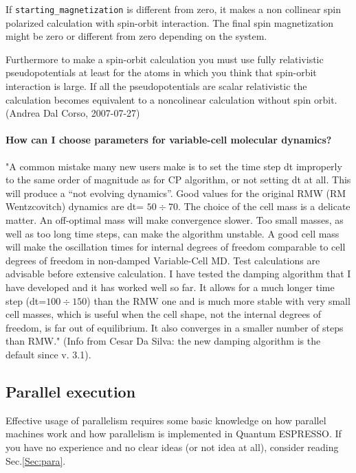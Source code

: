 \documentclass[12pt,a4paper]{article}
\def\qe{{\sc Quantum ESPRESSO}}
\begin{document}
If \texttt{starting\_magnetization} is different from zero, it makes a non
collinear spin polarized calculation with spin-orbit interaction. The 
final spin
magnetization might be zero or different from zero depending on the
system. 

Furthermore to make a spin-orbit calculation you must use fully
relativistic pseudopotentials at least for the atoms in which you
think that spin-orbit interaction is large. If all the pseudopotentials 
are scalar
relativistic the calculation becomes equivalent to a noncolinear
calculation without spin orbit. (Andrea Dal Corso, 2007-07-27)

\paragraph{How can I choose parameters for variable-cell molecular
  dynamics?}

"A common mistake many new users make is to set the time step dt
improperly to the same order of magnitude as for CP algorithm, or
not setting dt at all. This will produce a ``not evolving dynamics''.
Good values for the original RMW (RM Wentzcovitch) dynamics are 
dt= $50 \div 70$. The choice of the cell mass is a delicate matter. An
off-optimal mass will make convergence slower. Too small masses, as
well as too long time steps, can make the algorithm unstable. A good
cell mass will make the oscillation times for internal degrees of
freedom comparable to cell degrees of freedom in non-damped
Variable-Cell MD. Test calculations are advisable before extensive
calculation. I have tested the damping algorithm that I have developed
and it has worked well so far. It allows for a much longer time step
(dt=$100 \div 150$) than the RMW one and is much more stable with very
small cell masses, which is useful when the cell shape, not the
internal degrees of freedom, is far out of equilibrium. It also
converges in a smaller number of steps than RMW." (Info from Cesar Da
Silva: the new damping algorithm is the default since v. 3.1).

\subsection{Parallel execution}

Effective usage of parallelism requires some basic knowledge on how
parallel machines work and how parallelism is implemented in
\qe. If you have no experience and no clear ideas (or not
idea at all), consider reading Sec.\ref{Sec:para}.
\end{document}
